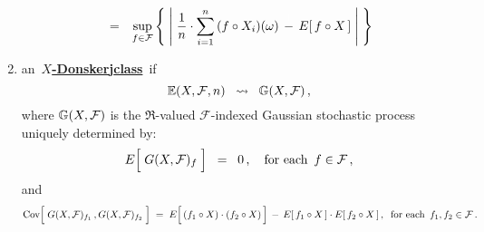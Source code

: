\begin{definition}
\begin{enumerate}
\begin{eqnarray*}
	\\
	& = &
		\underset{f\in\mathcal{F}}{\sup}\left\{\;
			\left\vert\;
				\dfrac{1}{n}\cdot \overset{n}{\underset{i=1}{\sum}}\,(f \circ X_{i})(\omega)
				\,\overset{{\color{white}+}}{-}\,
				E[\,f \circ X\,]
			\;\right\vert
		\;\right\}
	\end{eqnarray*}
\item
	an \,\underline{\textbf{$X$-Donsker{\color{white}j}class}}\, if
	\begin{equation*}
	\mathbb{E}(X,\mathcal{F},n) \;\;\rightsquigarrow\;\; \mathbb{G}(X,\mathcal{F})\,,
	\end{equation*}
	where $\mathbb{G}(X,\mathcal{F})$ is the $\Re$-valued $\mathcal{F}$-indexed
	Gaussian stochastic process uniquely determined by:
	\begin{equation*}
	E\!\left[\;\overset{{\color{white}.}}{G}(X,\mathcal{F})_{f}\;\right]
	\;\; = \;\;
		0\,, \quad\textnormal{for each \,$f\in\mathcal{F}$}\,,
	\end{equation*}
	and
	\begin{equation*}
	\Cov\!\left[\;G(X,\mathcal{F})_{f_{1}}\,\overset{{\color{white}\vert}}{,}\,G(X,\mathcal{F})_{f_{2}}\;\right]
	\; = \;
		E\!\left[\,(f_{1} \circ X)\!\overset{{\color{white}-}}{\cdot}\!(f_{2} \circ X)\,\right]
		\,-\,
		E\!\left[\,f_{1} \circ X\,\right] \cdot E\!\left[\,f_{2} \circ X\,\right],
		\;\;\textnormal{for each \,$f_{1}, f_{2} \in \mathcal{F}$}\,.
	\end{equation*}
\end{enumerate}
\end{definition}


\renewcommand{\theenumi}{\roman{enumi}}
\renewcommand{\labelenumi}{\textnormal{(\theenumi)}$\;\;$}

